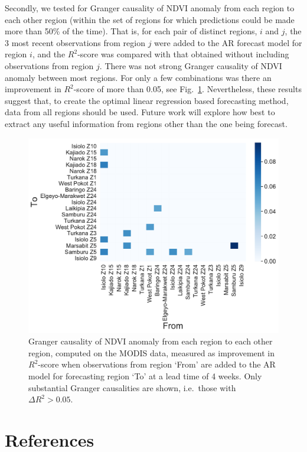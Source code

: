 \documentclass[review]{elsarticle}
\begin{document}
Secondly, we tested for Granger causality of NDVI anomaly from each region to each other region (within the set of regions for which predictions could be made more than 50\% of the time). That is, for each pair of distinct regions, $i$ and $j$, the 3 most recent observations from region $j$ were added to the AR forecast model for region $i$, and the $R^2$-score was compared with that obtained without including observations from region $j$. There was not strong Granger causality of NDVI anomaly between most regions. For only a few combinations was there an improvement in $R^2$-score of more than 0.05, see Fig.~\ref{fig:GCheatmap}. Nevertheless, these results suggest that, to create the optimal linear regression based forecasting method, data from all regions should be used. Future work will explore how best to extract any useful information from regions other than the one being forecast.



\begin{figure} 
	\centering
	\includegraphics[trim = 20mm 0mm 0mm 0mm,width=11 cm]{figures/GCheatmap2.pdf}
	\caption{Granger causality of NDVI anomaly from each region to each other region, computed on the MODIS data, measured as improvement in $R^2$-score when observations from region `From' are added to the AR model for forecasting region `To' at a lead time of 4 weeks. Only substantial Granger causalities are shown, i.e.~those with $\Delta R^2>0.05$.} \label{fig:GCheatmap}
\end{figure}



\newpage
\section*{References}


\end{document}
